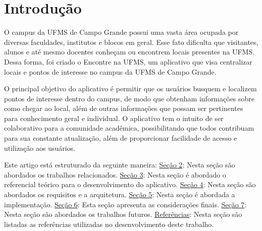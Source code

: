 \section{Introdução}
O campus da UFMS de Campo Grande possui uma vasta área ocupada por diversas faculdades, institutos e blocos em geral. Esse fato dificulta que visitantes, alunos e até mesmo docentes conheçam ou encontrem locais presentes na UFMS. Dessa forma, foi criado o Encontre na UFMS, um aplicativo que visa centralizar locais e pontos de interesse no campus da UFMS de Campo Grande.

O principal objetivo do aplicativo é permitir que os usuários busquem e localizem pontos de interesse dentro do campus, de modo que obtenham informações sobre como chegar ao local, além de outras informações que possam ser pertinentes para conhecimento geral e individual. O aplicativo tem o intuito de ser colaborativo para a comunidade acadêmica, possibilitando que todos contribuam para sua constante atualização, além de proporcionar facilidade de acesso e utilização aos usuários.

Este artigo está estruturado da seguinte maneira: \hyperref[sec:trabalhos_relacionados]{Seção 2}: Nesta seção são abordados os trabalhos relacionados. \hyperref[sec:referencial_teorico]{Seção 3}: Nesta seção é abordado o referencial teórico para o desenvolvimento do aplicativo. \hyperref[sec:arquitetura]{Seção 4}: Nesta seção são abordados os requisitos e a arquitetura. \hyperref[sec:implementacao]{Seção 5}: Nesta seção é abordada a implementação. \hyperref[sec:consideracoes_finais]{Seção 6}: Esta seção apresenta as considerações finais. \hyperref[sec:trabalhos_futuros]{Seção 7}: Nesta seção são abordados os trabalhos futuros. \hyperref[sec:referencias]{Referências}: Nesta seção são listadas as referências utilizadas no desenvolvimento deste trabalho.